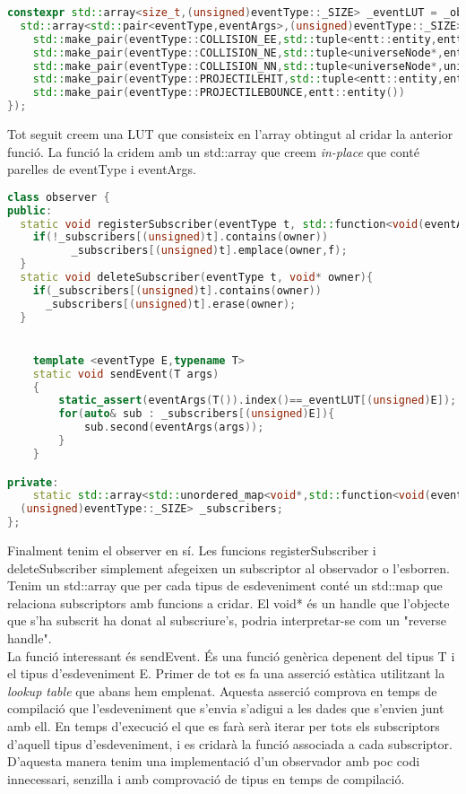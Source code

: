 \begin{lstlisting}[language=C++]
constexpr std::array<size_t,(unsigned)eventType::_SIZE> _eventLUT = _observertypetable(
  std::array<std::pair<eventType,eventArgs>,(unsigned)eventType::_SIZE>{
	std::make_pair(eventType::COLLISION_EE,std::tuple<entt::entity,entt::entity, double>()),
	std::make_pair(eventType::COLLISION_NE,std::tuple<universeNode*,entt::entity, double>()),
	std::make_pair(eventType::COLLISION_NN,std::tuple<universeNode*,universeNode*, double>()),
	std::make_pair(eventType::PROJECTILEHIT,std::tuple<entt::entity,entt::entity, double>()),
	std::make_pair(eventType::PROJECTILEBOUNCE,entt::entity())
});
\end{lstlisting}
Tot seguit creem una LUT que consisteix en l'array obtingut al cridar la anterior funció. La funció la cridem amb un std::array que creem \textit{in-place} que conté parelles de eventType i eventArgs.
\\
\begin{lstlisting}[language=C++]
class observer {
public:
  static void registerSubscriber(eventType t, std::function<void(eventArgs args)> f,void* owner){
    if(!_subscribers[(unsigned)t].contains(owner))
		  _subscribers[(unsigned)t].emplace(owner,f);
  }
  static void deleteSubscriber(eventType t, void* owner){
    if(_subscribers[(unsigned)t].contains(owner))
      _subscribers[(unsigned)t].erase(owner);
  }


	template <eventType E,typename T>
	static void sendEvent(T args)
	{
		static_assert(eventArgs(T()).index()==_eventLUT[(unsigned)E]);
		for(auto& sub : _subscribers[(unsigned)E]){
			sub.second(eventArgs(args));
		}
	}

private:
	static std::array<std::unordered_map<void*,std::function<void(eventArgs args)>>,
  (unsigned)eventType::_SIZE> _subscribers;
};
\end{lstlisting}
Finalment tenim el observer en sí. Les funcions registerSubscriber i deleteSubscriber simplement afegeixen un subscriptor al observador o l'esborren.
Tenim un std::array que per cada tipus de esdeveniment conté un std::map que relaciona subscriptors amb funcions a cridar. El void* és un handle que l'objecte que s'ha subscrit ha donat al subscriure's, podria interpretar-se com un "reverse handle".
\\
La funció interessant és sendEvent. És una funció genèrica depenent del tipus T i el tipus d'esdeveniment E. Primer de tot es fa una asserció estàtica utilitzant la \textit{lookup table} que abans hem emplenat. Aquesta asserció comprova en temps de compilació que l'esdeveniment que s'envia s'adigui a les dades que s'envien junt amb ell.
En temps d'execució el que es farà serà iterar per tots els subscriptors d'aquell tipus d'esdeveniment, i es cridarà la funció associada a cada subscriptor.
\\
D'aquesta manera tenim una implementació d'un observador amb poc codi innecessari, senzilla i amb comprovació de tipus en temps de compilació.
